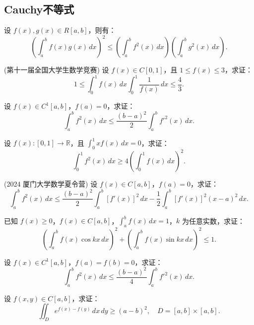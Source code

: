\documentclass[lang=cn,10pt,thmcnt=section]{elegantbook}
\begin{document}
\subsection{Cauchy不等式}
\begin{example}[Cauchy不等式]
	设 \( f(x), g(x) \in R[a, b] \)，则有：
\[
\left( \int_a^b f(x) g(x) \, dx \right)^2 \leq \left( \int_a^b f^2(x) \, dx \right) \left( \int_a^b g^2(x) \, dx \right).
\]
\end{example}
\begin{example}
	(第十一届全国大学生数学竞赛) 设 \( f(x) \in C[0,1] \)，且 \( 1 \leq f(x) \leq 3 \)，求证：
\[
1 \leq \int_0^1 f(x) \, dx \int_0^1 \frac{1}{f(x)} \, dx \leq \frac{4}{3}.
\]
\end{example}
\begin{example}
	设 \( f(x) \in C^1[a, b] \)，\( f(a) = 0 \)，求证：
\[
\int_a^b f^2(x) \, dx \leq \frac{(b - a)^2}{2} \int_a^b f'^2(x) \, dx.
\]
\end{example}
\begin{example}
	设 \( f(x): [0,1] \to \mathbb{R} \)，且 \(\int_0^1 x f(x) \, dx = 0\)，求证：
\[
\int_0^1 f^2(x) \, dx \geq 4 \left( \int_0^1 f(x) \, dx \right)^2.
\]
\end{example}
\begin{example}
	(2024 厦门大学数学夏令营) 设 \( f(x) \in C[a, b] \)，\( f(a) = 0 \)，求证：
\[
\int_a^b f^2(x) \, dx \leq \frac{(b - a)^2}{2} \int_a^b [f'(x)]^2 \, dx - \frac{1}{2} \int_a^b [f'(x)]^2 (x - a)^2 \, dx.
\]
\end{example}
\begin{example}
	已知 \( f(x) \geq 0 \)，\( f(x) \in C[a, b] \)，\(\int_a^b f(x) \, dx = 1\)，\( k \) 为任意实数，求证：
    \[
    \left( \int_a^b f(x) \cos kx \, dx \right)^2 + \left( \int_a^b f(x) \sin kx \, dx \right)^2 \leq 1.
    \]
\end{example}
\begin{example}
	设 \( f(x) \in C^1[a, b] \)，\( f(a) = f(b) = 0 \)，求证：
    \[
    \int_a^b f^2(x) \, dx \leq \frac{(b - a)^2}{4} \int_a^b f'^2(x) \, dx.
    \]
\end{example}
\begin{example}
	设 \( f(x, y) \in C[a, b] \)，求证：
    \[
    \iint_{D} e^{f(x) - f(y)} \, dx \, dy \geq (a - b)^2, \quad D = [a, b] \times [a, b].
    \]
\end{example}
\end{document}
